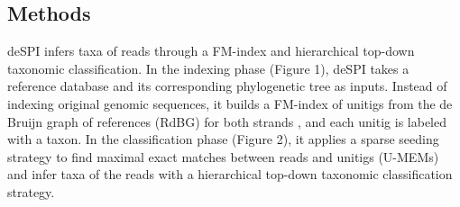 \documentclass[a0,portrait, svgnames]{a0poster}
\begin{document}
\begin{multicols}{2}
\section*{Methods}
deSPI infers taxa of reads through a FM-index and hierarchical top-down taxonomic classification. In the indexing phase (Figure 1), deSPI takes a reference database and its corresponding phylogenetic tree as inputs. Instead of indexing original genomic sequences, it builds a FM-index of unitigs from the de Bruijn graph of references (RdBG) for both strands \cite{Liu2016-vy}, and each unitig is labeled with a taxon. In the classification phase (Figure 2), it applies a sparse seeding strategy to find maximal exact matches between reads and unitigs (U-MEMs) and infer taxa of the reads with a hierarchical top-down taxonomic classification strategy. 

\begin{center}\vspace{1cm}

\def\refs{{"AGCTATCGCATGT","ATCGCATGTGTACGATC","TGTCAGTA"}}
\def\refsAnota{{"G1 (Taxon=A)","G2 (Taxon=B)","G3 (Taxon=C)"}}
\def\nodelabels{{"AGCT","GCTA","CTAT","TATC","ATCG","TCGC","CGCA","GCAT","CATG","ATGT","TGTC","GTCA","TCAG","CAGT","AGTA","TGTG", "GTGT","TGTA", "GTAC","TACG","ACGA","CGAT","GATC"
}}


\end{center}
\end{multicols}
\end{document}
